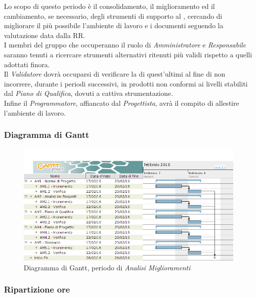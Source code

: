 Lo scopo di questo periodo \`e il consolidamento, il miglioramento ed il cambiamento, se necessario, degli strumenti di supporto al , cercando di migliorare il pi\`u possibile l'ambiente di lavoro e i documenti seguendo la valutazione data dalla RR.\\
I membri del gruppo che occuperanno il ruolo di \textit{Amministratore} e \textit{Responsabile} saranno tenuti a ricercare strumenti alternativi ritenuti pi\`u validi rispetto a quelli adottati finora.\\
Il \textit{Validatore} dovr\`a occuparsi di verificare la  di quest'ultimi al fine di non incorrere, durante i periodi successivi, in prodotti non conformi ai livelli stabiliti dal \textit{Piano di Qualifica}, dovuti a cattiva strumentazione.\\
Infine il \textit{Programmatore}, affiancato dal \textit{Progettista}, avr\`a il compito di allestire l'ambiente di lavoro.

\subsubsection{Diagramma di Gantt}
\begin{figure}[ht!]
\includegraphics[width=1\textwidth]{res/img/pianificazione/AnalisiMiglioramenti.png}
\caption{Diagramma di Gantt, periodo di \textit{Analisi Miglioramenti}}
\end{figure}


\subsubsection{Ripartizione ore}


